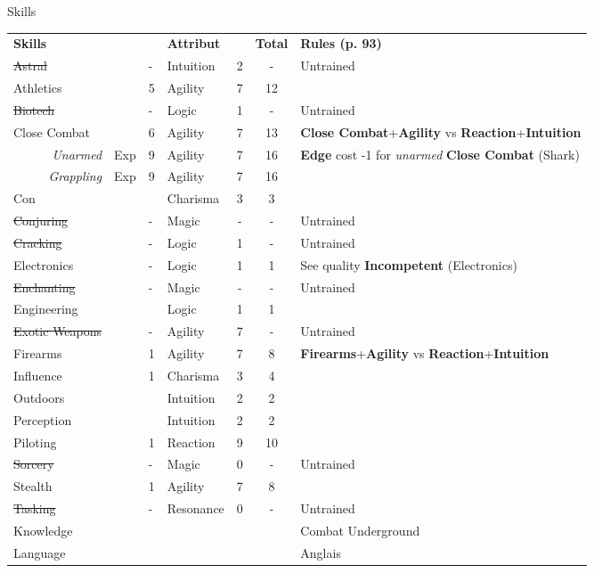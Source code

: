 \documentclass[french, a4paper]{scrartcl}
\begin{document}
	
	\begin{srbox}{Skills}
		\begin{tabular}{l l l l c c l} \\		
			\textbf{Skills}     &     &   & \textbf{Attribut} &   & \textbf{Total} & \textbf{Rules (p. 93)} \\
			\st{Astral}         &     & - & Intuition & 2 & -     & Untrained \\
			Athletics           &     & 5 & Agility   & 7 & 12    & \\
			\st{Biotech}        &     & - & Logic     & 1 & -     & Untrained \\			
			Close Combat        &     & 6 & Agility   & 7 & 13    & \textbf{Close Combat}+\textbf{Agility} vs \textbf{Reaction}+\textbf{Intuition} \\
			\multicolumn{1}{r}{\textit{Unarmed}}  & Exp & 9 & Agility   & 7 & 16    & \textbf{Edge} cost -1 for \textit{unarmed} \textbf{Close Combat} (Shark) \\
			\multicolumn{1}{r}{\textit{Grappling}}& Exp & 9 & Agility   & 7 & 16    & \\
			Con                 &     &   & Charisma  & 3 & 3     & \\
			\st{Conjuring}      &     & - & Magic     & - & -     & Untrained \\			
			\st{Cracking}       &     & - & Logic     & 1 & -     & Untrained \\			
			Electronics 		&	  & - &	Logic     & 1 & 1     & See quality \textbf{Incompetent} (Electronics) \\
			\st{Enchanting}     &     & - & Magic     & - & -     & Untrained \\			
			Engineering 		&	  &   &	Logic     & 1 & 1     & \\
			\st{Exotic Weapons} &     & - & Agility   & 7 & -     & Untrained \\			
			Firearms  			&	  & 1 & Agility   & 7 & 8     & \textbf{Firearms}+\textbf{Agility} vs \textbf{Reaction}+\textbf{Intuition} \\
			Influence 			&     & 1 &	Charisma  & 3 & 4     & \\
			Outdoors 			&	  &   & Intuition & 2 & 2     & \\
			Perception 			&     &   & Intuition & 2 & 2     & \\
			Piloting         	&     & 1 &	Reaction  & 9 & 10    & \\
			\st{Sorcery}        &     & - & Magic     & 0 & -     & Untrained \\			
			Stealth  			&     & 1 &	Agility   & 7 & 8     & \\
			\st{Tasking}    	&     & - &	Resonance & 0 & -     & Untrained \\
			Knowledge 			&	  &   &           &   &       & Combat Underground \\	
			Language            &     &   &           &   &       & Anglais \\	
		\end{tabular}	
	\end{srbox}
	
\end{document}

